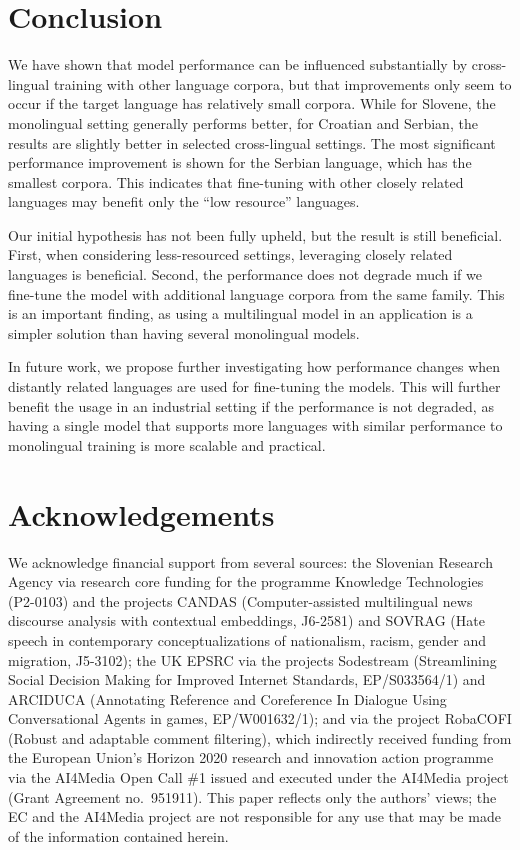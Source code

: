 \documentclass[11pt]{article}
\begin{document}
\section{Conclusion}
\label{sec:conclusion}
We have shown that model performance can be influenced substantially by cross-lingual training with other language corpora, but that improvements only seem to occur if the target language has relatively small corpora. 
While for Slovene, the monolingual setting generally performs better, for Croatian and Serbian, the results are slightly better in selected cross-lingual settings.
The most significant performance improvement is shown for the Serbian language, which has the smallest corpora. 
This indicates that fine-tuning with other closely related languages may benefit only the ``low resource'' languages.

Our initial hypothesis has not been fully upheld, but the result is still beneficial. 
First, when considering less-resourced settings, leveraging closely related languages is beneficial. 
Second, the performance does not degrade much if we fine-tune the model with additional language corpora from the same family.
This is an important finding, as using a multilingual model in an application is a simpler solution than having several monolingual models.

In future work, we propose further investigating how performance changes when distantly related languages are used for fine-tuning the models. 
This will further benefit the usage in an industrial setting if the performance is not degraded, as having a single model that supports more languages with similar performance to monolingual training is more scalable and practical.

\section*{Acknowledgements}

We acknowledge financial support from several sources: the Slovenian Research Agency via research core funding for the programme Knowledge Technologies (P2-0103) and the projects CANDAS (Computer-assisted multilingual news discourse analysis with contextual embeddings, J6-2581) and SOVRAG (Hate speech in contemporary conceptualizations of nationalism, racism, gender and migration, J5-3102); the UK EPSRC via the projects Sodestream (Streamlining Social Decision Making for Improved Internet Standards, EP/S033564/1) and ARCIDUCA (Annotating Reference and Coreference In Dialogue Using Conversational Agents in games, EP/W001632/1); and via the project RobaCOFI (Robust and adaptable comment filtering), which indirectly received funding from the European Union's Horizon 2020 research and innovation action programme via the AI4Media Open Call \#1 issued and executed under the AI4Media project (Grant Agreement no.\ 951911).  This paper reflects only the authors' views; the EC and the AI4Media project are not responsible for any use that may be made of the information contained herein.



\end{document}

